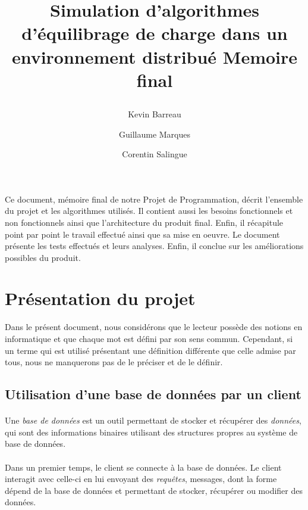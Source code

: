 \documentclass[12pt]{article}
\title{
 \begin{minipage}\linewidth
        \centering
        Simulation d'algorithmes d'équilibrage de charge dans un environnement distribué 
        \vskip3pt
        \large Memoire final
    \end{minipage}
 }
\author{Kevin Barreau \and Guillaume Marques \and Corentin Salingue}
\begin{document}
\maketitle

\abstract
Ce document, mémoire final de notre Projet de Programmation, décrit l'ensemble du projet et les algorithmes utilisés. Il contient aussi les besoins fonctionnels et non fonctionnels ainsi que l'architecture du produit final. Enfin, il récapitule point par point le travail effectué ainsi que sa mise en oeuvre. Le document présente les tests effectués et leurs analyses. Enfin, il conclue sur les améliorations possibles du produit.

\newpage


\renewcommand{\contentsname}{Sommaire} 
\tableofcontents

\newpage

\listoffigures

\newpage

\section{Présentation du projet}

Dans le présent document, nous considérons que le lecteur possède des notions en informatique et que chaque mot est défini par son sens commun. Cependant, si un terme qui est utilisé présentant une définition différente que celle admise par tous, nous ne manquerons pas de le préciser et de le définir.

\subsection{Utilisation d'une base de données par un client}

\paragraph{} Une \textit{base de données} est un outil permettant de stocker et récupérer des \textit{données}, qui sont des informations binaires utilisant des structures propres au système de base de données.

\paragraph{} Dans un premier temps, le client se connecte à la base de données.
Le client interagit avec celle-ci en lui envoyant des \textit{requêtes}, messages, dont la forme dépend de la base de données et permettant de stocker, récupérer ou modifier des données.
\end{document}
